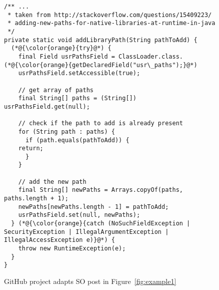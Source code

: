 \begin{figure}[t]%
	\centering
\begin{lstlisting}[]
/** ...
 * taken from http://stackoverflow.com/questions/15409223/
 * adding-new-paths-for-native-libraries-at-runtime-in-java
 */
private static void addLibraryPath(String pathToAdd) {
  (*@{\color{orange}{try}@*) {
    final Field usrPathsField = ClassLoader.class.(*@{\color{orange}{getDeclaredField("usr\_paths");}@*)
    usrPathsField.setAccessible(true);

    // get array of paths
    final String[] paths = (String[]) usrPathsField.get(null);

    // check if the path to add is already present
    for (String path : paths) {
      if (path.equals(pathToAdd)) {
	return;
      }
    }

    // add the new path
    final String[] newPaths = Arrays.copyOf(paths, paths.length + 1);
    newPaths[newPaths.length - 1] = pathToAdd;
    usrPathsField.set(null, newPaths);
  } (*@{\color{orange}{catch (NoSuchFieldException | SecurityException | IllegalArgumentException |    IllegalAccessException e)}@*) {
	throw new RuntimeException(e);
  }
}
\end{lstlisting}
        \vspace{-16pt}
        \caption{GitHub project  adapts SO post in Figure~\ref{fig:example1}}
        \label{fig:example2}
\end{figure}

